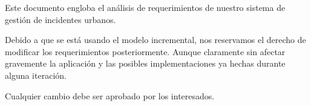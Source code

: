 Este documento engloba el análisis de requerimientos de nuestro sistema de gestión de incidentes urbanos.

Debido a que se está usando el modelo incremental, nos reservamos el derecho de modificar los requerimientos posteriormente. Aunque claramente sin afectar gravemente la aplicación y las posibles implementaciones ya hechas durante alguna iteración.

Cualquier cambio debe ser aprobado por los interesados.